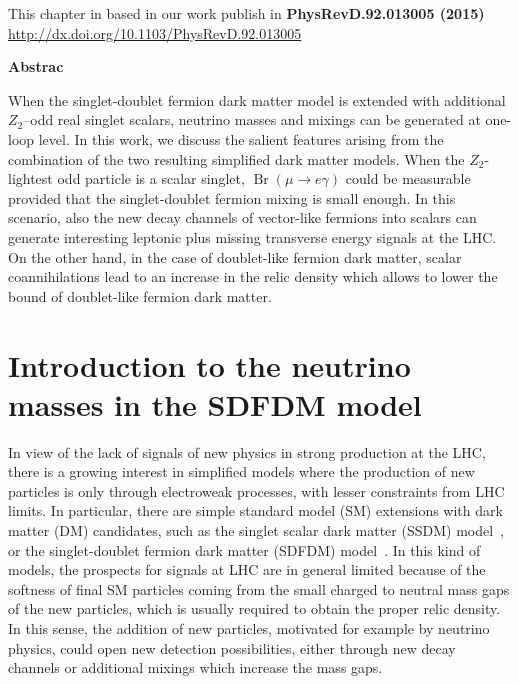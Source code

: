 \begin{flushright}
This chapter in based in our work publish in \textbf{PhysRevD.92.013005 (2015)}\\ 
\url{http://dx.doi.org/10.1103/PhysRevD.92.013005}
\end{flushright}
\begin{center}
\textbf{Abstrac}
\end{center}

  When the singlet-doublet fermion dark matter model is extended with
  additional $Z_2$--odd real  singlet scalars, neutrino masses and mixings
  can be generated at one-loop level.  In this work, we discuss the salient 
 features arising from the combination of the two resulting
  simplified dark matter models.  When the $Z_2$-lightest odd particle is a
  scalar singlet, $\operatorname{Br}(\mu\to e \gamma)$ could be
  measurable provided that the singlet-doublet fermion mixing is small
  enough. In this scenario, also the new decay channels of vector-like
  fermions into scalars can generate interesting leptonic plus
  missing transverse energy signals at the LHC. On the other hand, in
  the case of doublet-like fermion dark matter, scalar coannihilations
  lead to an increase in the relic density which allows to lower the bound of
  doublet-like fermion dark matter.

\section{Introduction to the neutrino masses in the SDFDM model}
%
In view of the lack of signals of new physics in strong production at the
LHC, there is a growing interest in simplified models where the
production of new particles is only through electroweak processes,
with lesser constraints from LHC limits.
In particular, there are simple standard model (SM) extensions with
dark matter (DM) candidates, such as the singlet scalar dark
matter (SSDM)
model~\cite{Silveira:1985rk,McDonald:1993ex,Burgess:2000yq}, or the
singlet-doublet fermion dark matter (SDFDM)
model~\cite{ArkaniHamed:2005yv,Mahbubani:2005pt,D'Eramo:2007ga,Enberg:2007rp,Cohen:2011ec,Cheung:2013dua}.
In this kind of models, the prospects for signals at LHC are in general
limited because of the softness of final SM particles coming from the
small charged to neutral mass gaps of the new particles, which is usually required 
to obtain the proper relic density.
In this sense, the addition of new particles, motivated for example by
neutrino physics, could open new detection possibilities, either
through new decay channels or additional mixings which increase the
mass gaps.

